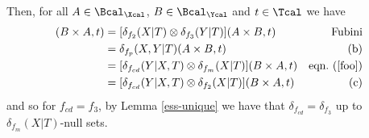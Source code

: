 \begin{enumerate}
\begin{gradedsolution}
\begin{enumerate}
    Then, for all $A\in \Bcal_\Xcal$, $B\in\Bcal_\Ycal$ and $t\in\Tcal$ we have
    \begin{align*}
      [\delta_{f_3}(Y|T)\otimes \delta_{f_2}(X|T)](B\times A, t) &= [\delta_{f_2}(X|T)\otimes \delta_{f_3}(Y|T)](A\times B, t) &\text{Fubini} \\
      &= \delta_{f_p}(X, Y|T)(A\times B, t) &\text{(b)} \\
      &= [\delta_{f_{cd}}(Y|X, T) \otimes \delta_{f_m}(X|T)](B\times A, t) &\text{eqn.\ (\ref*{foo})} \\
      &= [\delta_{f_{cd}}(Y|X, T) \otimes \delta_{f_2}(X|T)](B\times A, t) &\text{(c)}
    \end{align*}
    and so for $f_{cd} = f_3$, by Lemma \ref*{ess-unique} we have that $\delta_{f_{cd}} = \delta_{f_3}$ up to $\delta_{f_m}(X|T)$-null sets.

  \end{enumerate}
\end{gradedsolution}

 



    



\end{enumerate}
